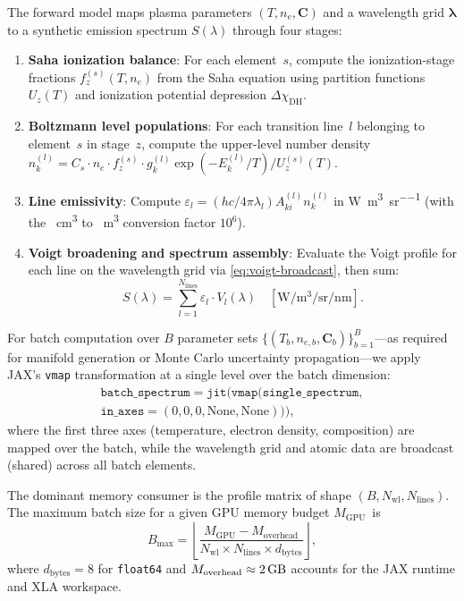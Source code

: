 The forward model maps plasma parameters $(T, n_e, \bm{C})$ and a wavelength grid $\bm{\lambda}$ to a synthetic emission spectrum $S(\lambda)$ through four stages:
\begin{enumerate}
  \item \textbf{Saha ionization balance}: For each element~$s$, compute the ionization-stage fractions $f_z^{(s)}(T, n_e)$ from the Saha equation using partition functions $U_z(T)$ and ionization potential depression $\Delta\chi_\mathrm{DH}$.
  \item \textbf{Boltzmann level populations}: For each transition line~$l$ belonging to element~$s$ in stage~$z$, compute the upper-level number density $n_k^{(l)} = C_s \cdot n_e \cdot f_z^{(s)} \cdot g_k^{(l)} \exp(-E_k^{(l)} / T) / U_z^{(s)}(T)$.
  \item \textbf{Line emissivity}: Compute $\varepsilon_l = (hc / 4\pi\lambda_l) A_{ki}^{(l)} n_k^{(l)}$ in \si{\watt\per\cubic\metre\per\steradian} (with the \si{\per\cubic\centi\metre} to \si{\per\cubic\metre} conversion factor $10^6$).
  \item \textbf{Voigt broadening and spectrum assembly}: Evaluate the Voigt profile for each line on the wavelength grid via \cref{eq:voigt-broadcast}, then sum:
    \begin{equation}
      S(\lambda) = \sum_{l=1}^{N_\mathrm{lines}} \varepsilon_l \cdot V_l(\lambda) \quad [\si{\watt\per\cubic\metre\per\steradian\per\nano\metre}].
      \label{eq:spectrum}
    \end{equation}
\end{enumerate}

For batch computation over $B$ parameter sets $\{(T_b, n_{e,b}, \bm{C}_b)\}_{b=1}^B$---as required for manifold generation or Monte Carlo uncertainty propagation---we apply JAX's \texttt{vmap} transformation at a single level over the batch dimension:
\begin{multline}
  \texttt{batch\_spectrum} = \texttt{jit}\bigl(\texttt{vmap}\bigl(\texttt{single\_spectrum},\\
  \texttt{in\_axes}=(0, 0, 0, \text{None}, \text{None})\bigr)\bigr),
  \label{eq:vmap}
\end{multline}
where the first three axes (temperature, electron density, composition) are mapped over the batch, while the wavelength grid and atomic data are broadcast (shared) across all batch elements.

The dominant memory consumer is the profile matrix of shape
$(B,\allowbreak N_\mathrm{wl},\allowbreak N_\mathrm{lines})$.
The maximum batch size for a given GPU memory budget $M_\mathrm{GPU}$~is
\begin{equation}
  B_\mathrm{max} = \left\lfloor \frac{M_\mathrm{GPU} - M_\mathrm{overhead}}{N_\mathrm{wl} \times N_\mathrm{lines} \times d_\mathrm{bytes}} \right\rfloor,
  \label{eq:bmax}
\end{equation}
where $d_\mathrm{bytes} = 8$ for \texttt{float64} and $M_\mathrm{overhead} \approx \SI{2}{\giga\byte}$ accounts for the JAX runtime and XLA workspace.

